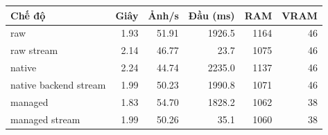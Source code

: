 \begin{tabular}{lrrrrr}
\toprule
Chế độ & Giây & Ảnh/s & Đầu (ms) & RAM & VRAM \\
\midrule
raw & 1.93 & 51.91 & 1926.5 & 1164 & 46 \\
raw stream & 2.14 & 46.77 & 23.7 & 1075 & 46 \\
native & 2.24 & 44.74 & 2235.0 & 1137 & 46 \\
native backend stream & 1.99 & 50.23 & 1990.8 & 1071 & 46 \\
managed & 1.83 & 54.70 & 1828.2 & 1062 & 38 \\
managed stream & 1.99 & 50.26 & 35.1 & 1060 & 38 \\
\bottomrule
\end{tabular}
